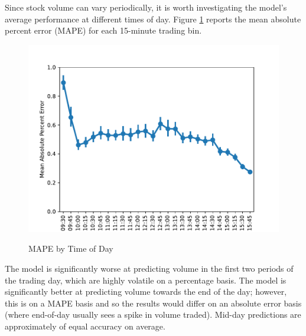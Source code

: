 \documentclass[12pt]{article}
\begin{document}
Since stock volume can vary periodically, it is worth investigating the model's average performance at different times of day. Figure \ref{fig:mape_by_time} reports the mean absolute percent error (MAPE) for each 15-minute trading bin.
\begin{figure}[H]
    \centering
    \caption{MAPE by Time of Day}
    \includegraphics[width=0.75\linewidth]{../Output/mape_by_time.pdf}
    \label{fig:mape_by_time}
\end{figure}
The model is significantly worse at predicting volume in the first two periods of the trading day, which are highly volatile on a percentage basis. The model is significantly better at predicting volume towards the end of the day; however, this is on a MAPE basis and so the results would differ on an absolute error basis (where end-of-day usually sees a spike in volume traded). Mid-day predictions are approximately of equal accuracy on average.
\end{document}
